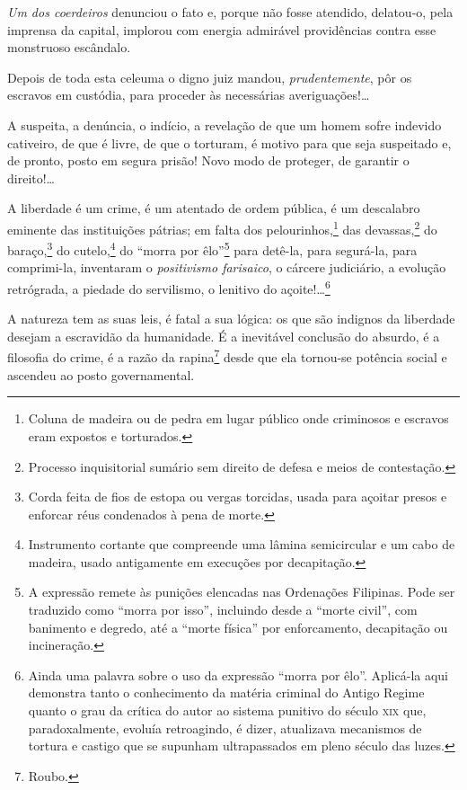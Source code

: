 {\emph{Um dos coerdeiros} denunciou o fato e, porque não fosse atendido,
delatou-o, pela imprensa da capital, implorou com energia admirável
providências contra esse monstruoso escândalo.

Depois de toda esta celeuma o digno juiz mandou, \emph{prudentemente},
pôr os escravos em custódia, para proceder às necessárias
averiguações!\ldots{}

A suspeita, a denúncia, o indício, a revelação de que um homem sofre
indevido cativeiro, de que é livre, de que o torturam, é motivo para que
seja suspeitado e, de pronto, posto em segura prisão! Novo modo de
proteger, de garantir o direito!\ldots{}

A liberdade é um crime, é um atentado de ordem pública, é um descalabro
eminente das instituições pátrias; em falta dos pelourinhos,\footnote{
  Coluna de madeira ou de pedra em lugar público onde criminosos e
  escravos eram expostos e torturados.} das devassas,\footnote{
  Processo inquisitorial sumário sem direito de defesa e meios de
  contestação.} do baraço,\footnote{Corda feita de fios de estopa ou
  vergas torcidas, usada para açoitar presos e enforcar réus condenados
  à pena de morte.} do cutelo,\footnote{Instrumento cortante que
  compreende uma lâmina semicircular e um cabo de madeira, usado
  antigamente em execuções por decapitação.} do ``morra por
êlo''\footnote{A expressão remete às punições elencadas nas Ordenações
  Filipinas. Pode ser traduzido como ``morra por isso'', incluindo desde a
  ``morte civil'', com banimento e degredo, até a ``morte física'' por
  enforcamento, decapitação ou incineração.} para detê-la, para
segurá-la, para comprimi-la, inventaram o \emph{positivismo farisaico},
o cárcere judiciário, a evolução retrógrada, a piedade do servilismo, o
lenitivo do açoite!\ldots{}\footnote{Ainda uma palavra sobre o uso
  da expressão ``morra por êlo''. Aplicá-la aqui demonstra tanto o
  conhecimento da matéria criminal do Antigo Regime quanto o grau da
  crítica do autor ao sistema punitivo do século \textsc{xix} que,
  paradoxalmente, evoluía retroagindo, é dizer, atualizava mecanismos de
  tortura e castigo que se supunham ultrapassados em pleno século das
  luzes.}

A natureza tem as suas leis, é fatal a sua lógica: os que são indignos
da liberdade desejam a escravidão da humanidade. É a inevitável
conclusão do absurdo, é a filosofia do crime, é a razão da
rapina\footnote{Roubo.} desde que ela tornou-se potência social e
ascendeu ao posto governamental.

}
